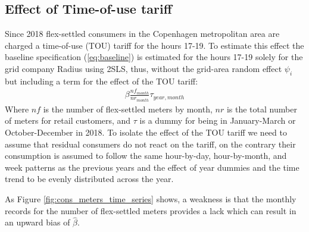 \subsection{Effect of Time-of-use tariff}
\label{subsec:e_tout}
Since 2018 flex-settled consumers in the Copenhagen metropolitan area are charged a time-of-use (TOU) tariff for the hours 17-19. To estimate this effect the baseline specification (\ref{eq:baseline}) is estimated for the hours 17-19 solely for the grid company Radius using 2SLS, thus, without the grid-area random effect $\psi_i$ but including a term for the effect of the TOU tariff:
\begin{align}
  \beta\frac{nf_{month}}{nr_{month}}\tau_{year,month}
  \label{eq:tout}
\end{align}
Where $nf$ is the number of flex-settled meters by month, $nr$ is the total number of meters for retail customers, and $\tau$ is a dummy for being in January-March or October-December in 2018. To isolate the effect of the TOU tariff we need to assume that residual consumers do not react on the tariff, on the contrary their consumption is assumed to follow the same hour-by-day, hour-by-month, and week patterns as the previous years and the effect of year dummies and the time trend to be evenly distributed across the year.\par\vspace{-1em}
As Figure \ref{fig:cons_meters_time_series} shows, a weakness is that the monthly records for the number of flex-settled meters provides a lack which can result in an upward bias of $\hat{\beta}$.


